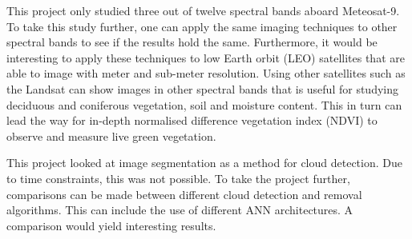 This project only studied three out of twelve spectral bands aboard Meteosat-9. To take this study further, one can apply the same imaging techniques to other spectral bands to see if the results hold the same. Furthermore, it would be interesting to apply these techniques to low Earth orbit (LEO) satellites that are able to image with meter and sub-meter resolution. Using other satellites such as the Landsat can show images in other spectral bands that is useful for studying deciduous and coniferous vegetation, soil and  moisture content. This in turn can lead the way for in-depth normalised difference vegetation index (NDVI) to observe and measure live green vegetation.
\par
This project looked at image segmentation as a method for cloud detection. Due to time constraints, this was not possible. To take the project further, comparisons can be made between different cloud detection and removal algorithms. This can include the use of different ANN architectures. A comparison would yield interesting results.


